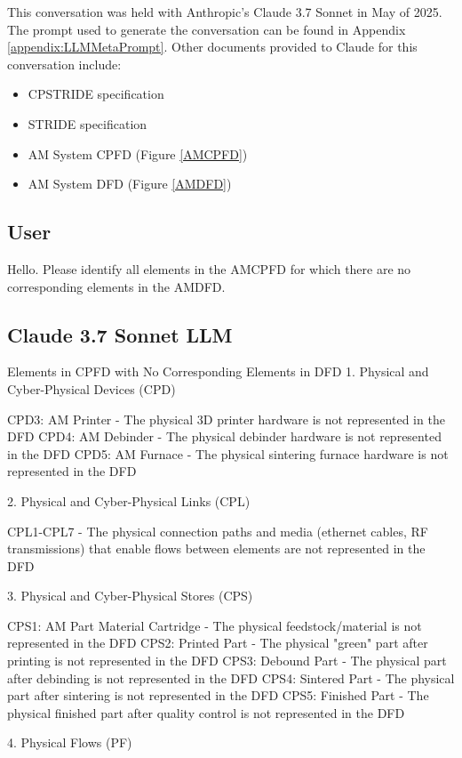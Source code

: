 This conversation was held with Anthropic's Claude 3.7 Sonnet in May of 2025. The prompt used to generate the conversation can be found in Appendix \ref{appendix:LLMMetaPrompt}. Other documents provided to Claude for this conversation include:
\begin{itemize}
    \item CPSTRIDE specification
    \item STRIDE specification \cite{kohnfelder_threats_1999,microsoft_uncover_2006}
    \item AM System CPFD (Figure \ref{AMCPFD})
    \item AM System DFD (Figure \ref{AMDFD})
\end{itemize}

\subsection{User}
Hello. Please identify all elements in the AMCPFD for which there are no corresponding elements in the AMDFD.

\subsection{Claude 3.7 Sonnet LLM}
Elements in CPFD with No Corresponding Elements in DFD
1. Physical and Cyber-Physical Devices (CPD)

CPD3: AM Printer - The physical 3D printer hardware is not represented in the DFD
CPD4: AM Debinder - The physical debinder hardware is not represented in the DFD
CPD5: AM Furnace - The physical sintering furnace hardware is not represented in the DFD

2. Physical and Cyber-Physical Links (CPL)

CPL1-CPL7 - The physical connection paths and media (ethernet cables, RF transmissions) that enable flows between elements are not represented in the DFD

3. Physical and Cyber-Physical Stores (CPS)

CPS1: AM Part Material Cartridge - The physical feedstock/material is not represented in the DFD
CPS2: Printed Part - The physical "green" part after printing is not represented in the DFD
CPS3: Debound Part - The physical part after debinding is not represented in the DFD
CPS4: Sintered Part - The physical part after sintering is not represented in the DFD
CPS5: Finished Part - The physical finished part after quality control is not represented in the DFD

4. Physical Flows (PF)

